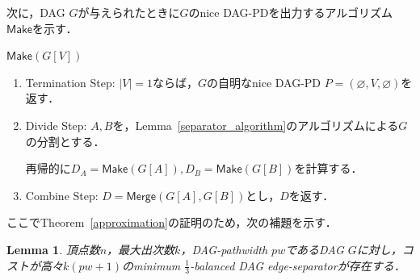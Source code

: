 \documentclass[master]{kuisthesis}		%
\theoremstyle{plain}
\newtheorem{lemma}{Lemma}
\theoremstyle{definition}
\begin{document}

次に，DAG $G$が与えられたときに$G$のnice DAG-PDを出力するアルゴリズム$\mathsf{Make}$を示す．


$\mathsf{Make}(G[V])$
\begin{enumerate}
    \item Termination Step: $|V|=1$ならば，$G$の自明なnice DAG-PD $P = (\varnothing, V, \varnothing)$を返す．
    \item Divide Step: $A, B$を，Lemma~\ref{separator_algorithm}のアルゴリズムによる$G$の分割とする．\par
    再帰的に$D_A = \mathsf{Make}(G[A]), D_B = \mathsf{Make}(G[B])$を計算する．
    \item Combine Step: $D = \mathsf{Merge}(G[A], G[B])$とし，$D$を返す．
\end{enumerate}


ここでTheorem~\ref{approximation}の証明のため，次の補題を示す．

\begin{lemma}\label{sepa_pw_relation}
    頂点数$n$，最大出次数$k$，DAG-pathwidth $pw$であるDAG $G$に対し，コストが高々$k(pw+1)$のminimum $\frac{1}{3}$-balanced DAG edge-separatorが存在する．
\end{lemma}
\end{document}
